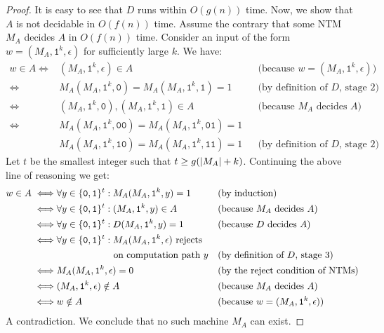 \begin{proof}
  It is easy to see that $D$ runs within $O(g(n))$ time. Now, we show that $A$ is not decidable in $O(f(n))$ time. Assume the contrary that some NTM $M_A$ decides $A$ in $O(f(n))$ time. Consider an input of the form $w = (M_A, \texttt{1}^k, \epsilon)$ for sufficiently large $k$. We have:
  \begin{align*}
    w \in A \iff & (M_A, \texttt{1}^k, \epsilon) \in A && \text{(because $w = (M_A, \texttt{1}^k, \epsilon)$)} \\
    \iff & M_A(M_A, \texttt{1}^k, \texttt{0}) = M_A(M_A, \texttt{1}^k, \texttt{1}) = 1 && \text{(by definition of $D$, stage 2)} \\
    \iff & (M_A, \texttt{1}^k, \texttt{0}), (M_A, \texttt{1}^k, \texttt{1}) \in A && \text{(because $M_A$ decides $A$)} \\
    \iff & M_A(M_A, \texttt{1}^k, \texttt{0}\texttt{0}) = M_A(M_A, \texttt{1}^k, \texttt{0}\texttt{1}) = 1 \\
    & M_A(M_A, \texttt{1}^k, \texttt{1}\texttt{0}) = M_A(M_A, \texttt{1}^k, \texttt{1}\texttt{1}) = 1 && \text{(by definition of $D$, stage 2)}
  \end{align*}
  Let $t$ be the smallest integer such that $t \geq g(| M_A | + k)$. Continuing the above line of reasoning we get:
  \begin{align*}
    w \in A \iff & \forall y \in \set{\texttt{0}, \texttt{1}}^t : M_A(M_A, \texttt{1}^k, y) = 1 && \text{(by induction)} \\
    \iff & \forall y \in \set{\texttt{0}, \texttt{1}}^t : (M_A, \texttt{1}^k, y) \in A && \text{(because $M_A$ decides $A$)} \\
    \iff & \forall y \in \set{\texttt{0}, \texttt{1}}^t : D(M_A, \texttt{1}^k, y) = 1 && \text{(because $D$ decides $A$)} \\
    \iff & \forall y \in \set{\texttt{0}, \texttt{1}}^t : \text{$M_A(M_A, \texttt{1}^k, \epsilon)$ rejects} \\
    & \phantom{\forall y \in \set{\texttt{0}, \texttt{1}}^t :} \ \text{on computation path $y$} && \text{(by definition of $D$, stage 3)} \\
    \iff & M_A(M_A, \texttt{1}^k, \epsilon) = 0 && \text{(by the reject condition of NTMs)} \\
    \iff & (M_A, \texttt{1}^k, \epsilon) \notin A && \text{(because $M_A$ decides $A$)} \\
    \iff & w \notin A && \text{(because $w = (M_A, \texttt{1}^k, \epsilon)$)}
  \end{align*}
  A contradiction. We conclude that no such machine $M_A$ can exist.
\end{proof}

